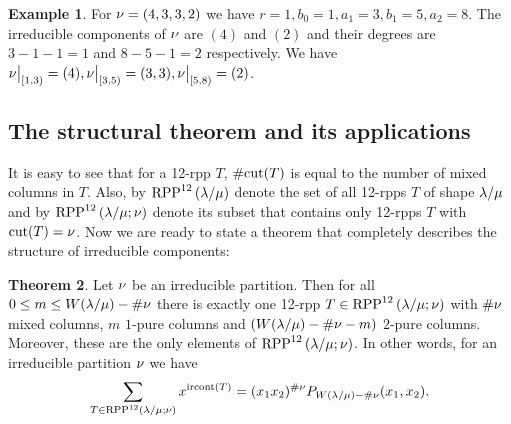 \documentclass[numbers=enddot,12pt,final,onecolumn,notitlepage]{scrartcl}%
\theoremstyle{definition}
\newtheorem{theo}{Theorem}[section]
\newtheorem{exmp}[theo]{Example}
\let\sumnonlimits\sum
\renewcommand{\sum}{\sumnonlimits\limits}
\begin{document}
\begin{exmp}
 For ${{\nu}}=(4,3,3,2)$ we have $r=1,b_0=1,a_1=3,b_1=5,a_2=8$. The irreducible components of ${{\nu}}$ are $(4)$ and $(2)$ and their degrees are $3-1-1=1$ and $8-5-1=2$ respectively. We have ${{{\nu}}\big|_{[1,3)}}=(4),{{{\nu}}\big|_{[3,5)}}=(3,3),{{{\nu}}\big|_{[5,8)}}=(2)$.
\end{exmp}


\subsection{The structural theorem and its applications}
It is easy to see that for a 12-rpp $T$, $\#{\operatorname*{cut}}(T)$ is equal to the number of mixed columns in $T$. Also, by ${\operatorname*{RPP}^{12}\left( \lambda/\mu\right)}$ denote the set of all 12-rpps $T$ of shape ${\lambda/\mu}$ and by ${\operatorname*{RPP}^{12}\left( \lambda/\mu ;{{\nu}} \right)}$ denote its subset that contains only 12-rpps $T$ with ${\operatorname*{cut}}(T)={{\nu}}$. Now we are ready to state a theorem that completely describes the structure of irreducible components:
\begin{theo}
\label{thm:12rpps}
 Let ${{\nu}}$ be an irreducible partition. Then for all $0\leq m\leq W({\lambda/\mu})-\#{{\nu}}$ there is exactly one 12-rpp $T\in{\operatorname*{RPP}^{12}\left( \lambda/\mu ;{{\nu}}\right)}$ with $\#{{\nu}}$ mixed columns, $m$ $1$-pure columns and $(W({\lambda/\mu})-\#{{\nu}}-m)$ $2$-pure columns. Moreover, these are the only elements of ${\operatorname*{RPP}^{12}\left( \lambda/\mu ;{{\nu}} \right)}$. In other words, for an irreducible partition ${{\nu}}$ we have
  \begin{equation}
 \label{eq:thm12rpps}
 \sum_{T\in\OneTwoRPPCutvar} x^{\ircont(T)}=(x_1x_2)^{\#\cutvar} P_{W(\lm)-\#\cutvar}(x_1,x_2).
 \end{equation}
\end{theo}
\end{document}
